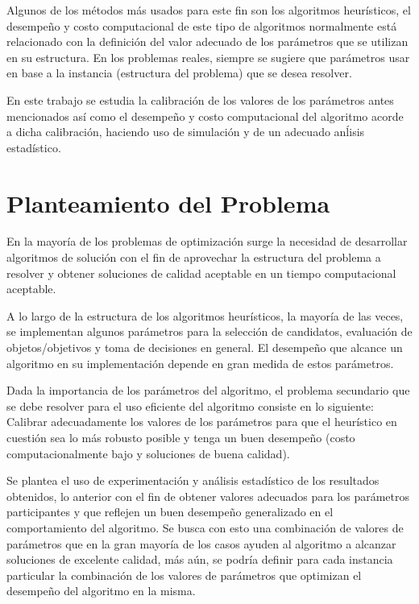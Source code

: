 \documentclass[review]{elsarticle}
\begin{document}
Algunos de los m\'etodos m\'as usados para este fin son los algoritmos heur\'isticos, el desempe\~no y costo computacional de este tipo de algoritmos normalmente est\'a relacionado con la definici\'on del valor adecuado de los par\'ametros que se utilizan en su estructura. En los problemas reales, siempre se sugiere que par\'ametros usar en base a la instancia (estructura del problema) que se desea resolver. 

En este trabajo se estudia la calibraci\'on de los valores de los par\'ametros antes mencionados  as\'i como el desempe\~no y costo computacional del algoritmo acorde a dicha calibraci\'on, haciendo uso de simulaci\'on y de un adecuado an\'lisis estad\'istico.

\section{Planteamiento del Problema}

En la mayor\'ia de los problemas de optimizaci\'on surge la necesidad de desarrollar algoritmos de soluci\'on con el fin de aprovechar la estructura del problema a resolver y obtener soluciones de calidad aceptable en un tiempo computacional aceptable. 

A lo largo de la estructura de los algoritmos heur\'isticos, la mayor\'ia de las veces, se implementan algunos par\'ametros para la selecci\'on de candidatos, evaluaci\'on de objetos/objetivos y toma de decisiones en general. El desempe\~no que alcance un algoritmo en su implementaci\'on depende en gran medida de estos par\'ametros.

Dada la importancia de los par\'ametros del algoritmo, el problema secundario que se debe resolver para el uso eficiente del algoritmo consiste en lo siguiente: Calibrar adecuadamente los valores de los par\'ametros para que el heur\'istico en cuesti\'on sea lo m\'as robusto posible y tenga un buen desempe\~no (costo computacionalmente bajo y soluciones de buena calidad).

Se plantea el uso de experimentaci\'on y an\'alisis estad\'istico de los resultados obtenidos, lo anterior con el fin de obtener valores adecuados para los par\'ametros participantes y que reflejen un buen desempe\~no generalizado en el comportamiento del algoritmo. Se busca con esto una combinaci\'on de valores de par\'ametros que en la gran mayor\'ia de los casos ayuden al algoritmo a alcanzar soluciones de excelente calidad, m\'as a\'un,  se podr\'ia definir para cada instancia particular la combinaci\'on de los valores de par\'ametros que optimizan el desempe\~no del algoritmo en la misma.
\end{document}
